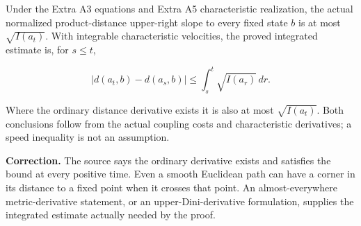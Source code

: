 \documentclass[11pt,a4paper]{report}
\begin{document}
Under the Extra A3 equations and Extra A5 characteristic
        realization, the actual normalized product-distance upper-right slope
        to every fixed state \(b\) is at most \(\sqrt{I(a_t)}\).
        With integrable characteristic velocities, the proved integrated
        estimate is, for \(s\le t\),


        \[|d(a_t,b)-d(a_s,b)|\le\int_s^t\sqrt{I(a_r)}\,dr.\]


Where the ordinary distance derivative exists it is also at most
        \(\sqrt{I(a_t)}\). Both conclusions follow from the actual coupling
        costs and characteristic derivatives; a speed inequality is not an
        assumption.



\textbf{Correction.} The source says the ordinary derivative exists and satisfies the bound at every positive time. Even a smooth Euclidean path can have a corner in its distance to a fixed point when it crosses that point. An almost-everywhere metric-derivative statement, or an upper-Dini-derivative formulation, supplies the integrated estimate actually needed by the proof.
\end{document}
